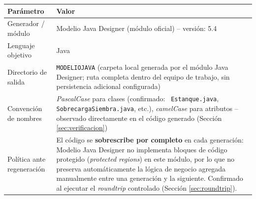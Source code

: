 \documentclass[11pt,a4paper]{article}
\begin{document}
\begin{center}
\begin{tabularx}{\linewidth}{lX}
\toprule
\textbf{Parámetro} & \textbf{Valor} \\
\midrule
Generador / módulo & Modelio Java Designer (módulo oficial) -- versión: 5.4 \\
Lenguaje objetivo & Java \\
Directorio de salida & \texttt{MODELIOJAVA} (carpeta local generada por el módulo
Java Designer; ruta completa dentro del equipo de trabajo, sin persistencia
adicional configurada) \\
Convención de nombres & \textit{PascalCase} para clases (confirmado: \texttt{
Estanque.java}, \texttt{SobrecargaSiembra.java}, etc.), \textit{camelCase} para
atributos -- observado directamente en el código generado (Sección
\ref{sec:verificacion}) \\
Política ante regeneración & El código se \textbf{sobrescribe por completo} en
cada generación: Modelio Java Designer no implementa bloques de código protegido
(\textit{protected regions}) en este módulo, por lo que no preserva
automáticamente la lógica de negocio agregada manualmente entre una generación y
la siguiente. Confirmado al ejecutar el \textit{roundtrip} controlado (Sección
\ref{sec:roundtrip}). \\
\bottomrule
\end{tabularx}
\end{center}
\end{document}
